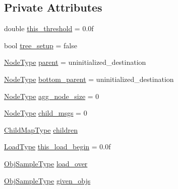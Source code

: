 \subsection*{Private Attributes}
\begin{DoxyCompactItemize}
\item 
double \hyperlink{structvt_1_1vrt_1_1collection_1_1lb_1_1_hierarchical_l_b_a7a1f6d8e3b327da08a682b344c7eaa08}{this\+\_\+threshold} = 0.\+0f
\item 
bool \hyperlink{structvt_1_1vrt_1_1collection_1_1lb_1_1_hierarchical_l_b_abd4e7b54c632de1dc2f2751676328f3d}{tree\+\_\+setup} = false
\item 
\hyperlink{namespacevt_a866da9d0efc19c0a1ce79e9e492f47e2}{Node\+Type} \hyperlink{structvt_1_1vrt_1_1collection_1_1lb_1_1_hierarchical_l_b_a92d34872e6196a0ba2e2097e944d05cc}{parent} = uninitialized\+\_\+destination
\item 
\hyperlink{namespacevt_a866da9d0efc19c0a1ce79e9e492f47e2}{Node\+Type} \hyperlink{structvt_1_1vrt_1_1collection_1_1lb_1_1_hierarchical_l_b_a613ebde72cb389a12eb7a522e0a5a690}{bottom\+\_\+parent} = uninitialized\+\_\+destination
\item 
\hyperlink{namespacevt_a866da9d0efc19c0a1ce79e9e492f47e2}{Node\+Type} \hyperlink{structvt_1_1vrt_1_1collection_1_1lb_1_1_hierarchical_l_b_aa2ef8e33aaed4f1ae6405a3652de21bc}{agg\+\_\+node\+\_\+size} = 0
\item 
\hyperlink{namespacevt_a866da9d0efc19c0a1ce79e9e492f47e2}{Node\+Type} \hyperlink{structvt_1_1vrt_1_1collection_1_1lb_1_1_hierarchical_l_b_aebc5548aa06994f3dffd752a36789d80}{child\+\_\+msgs} = 0
\item 
\hyperlink{structvt_1_1vrt_1_1collection_1_1lb_1_1_hierarchical_l_b_a95e5a93033703216cad8ec7a3da7a2ef}{Child\+Map\+Type} \hyperlink{structvt_1_1vrt_1_1collection_1_1lb_1_1_hierarchical_l_b_af79c0b7d47eb39f311a1a604863bd6c4}{children}
\item 
\hyperlink{structvt_1_1vrt_1_1collection_1_1lb_1_1_base_l_b_a215e22b9f12678303f49615ae3be05cc}{Load\+Type} \hyperlink{structvt_1_1vrt_1_1collection_1_1lb_1_1_hierarchical_l_b_a2d4333062fc0c28e7774b23300893889}{this\+\_\+load\+\_\+begin} = 0.\+0f
\item 
\hyperlink{structvt_1_1vrt_1_1collection_1_1lb_1_1_base_l_b_a331d7da5bbf2883238427d86b54ddd7b}{Obj\+Sample\+Type} \hyperlink{structvt_1_1vrt_1_1collection_1_1lb_1_1_hierarchical_l_b_aced5f1ddf40eb67f0a86ebe56d75d22c}{load\+\_\+over}
\item 
\hyperlink{structvt_1_1vrt_1_1collection_1_1lb_1_1_base_l_b_a331d7da5bbf2883238427d86b54ddd7b}{Obj\+Sample\+Type} \hyperlink{structvt_1_1vrt_1_1collection_1_1lb_1_1_hierarchical_l_b_a010367d94903aa52b9e48ecc715820c6}{given\+\_\+objs}

\end{DoxyCompactItemize}
